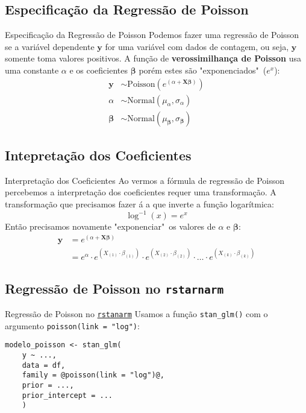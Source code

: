 \subsection{Especificação da Regressão de Poisson}
\begin{frame}{Especificação da Regressão de Poisson}
	Podemos fazer uma regressão de Poisson se a variável dependente
	$\boldsymbol{y}$ for uma variável com dados de contagem, ou seja,
	$\boldsymbol{y}$ somente toma valores positivos. A função de \textbf{verossimilhança de
		Poisson} usa uma constante $\alpha$ e os coeficientes $\boldsymbol{\beta}$
	porém estes são "exponenciados"~($e^x$):
	$$
		\begin{aligned}
			\boldsymbol{y}     & \sim \text{Poisson}\left( e^{(\alpha +  \mathbf{X} \boldsymbol{\beta})} \right) \\
			\alpha             & \sim \text{Normal}(\mu_\alpha, \sigma_\alpha)                                   \\
			\boldsymbol{\beta} & \sim \text{Normal}(\mu_{\boldsymbol{\beta}}, \sigma_{\boldsymbol{\beta}})
		\end{aligned}
	$$
\end{frame}

\subsection{Intepretação dos Coeficientes}
\begin{frame}{Interpretação dos Coeficientes}
	Ao vermos a fórmula de regressão de Poisson percebemos a interpretação dos
	coeficientes requer uma transformação. A transformação que precisamos fazer á a
	que inverte a função logarítmica:
	$$
		\log^{-1}(x) = e^x
	$$
	Então precisamos novamente "exponenciar"~os valores de $\alpha$ e
	$\boldsymbol{\beta}$:
	$$
		\begin{aligned}
			\boldsymbol{y} & = e^{(\alpha +  \mathbf{X} \boldsymbol{\beta})}                                                                                                                                         \\
			               & = e^{\alpha} \cdot e^{ \left( X_{(1)} \cdot \beta_{(1)} \right) } \cdot e^{ \left( X_{(2)} \cdot \beta_{(2)} \right) } \cdot \dots \cdot e^{ \left( X_{(k)} \cdot \beta_{(k)} \right) }
		\end{aligned}
	$$
\end{frame}

\subsection{Regressão de Poisson no \texttt{rstarnarm}}
\begin{frame}[fragile]{Regressão de Poisson no \href{http://mc-stan.org/rstanarm/}{\texttt{rstanarm}}}
	Usamos a função \texttt{stan\_glm()} com o argumento \texttt{poisson(link = "log")}:
	\vfill
	\begin{lstlisting}[basicstyle=\small]
    modelo_poisson <- stan_glm(
    y ~ ...,
    data = df,
    family = @poisson(link = "log")@,
    prior = ...,
    prior_intercept = ...
    )
    \end{lstlisting}
\end{frame}


